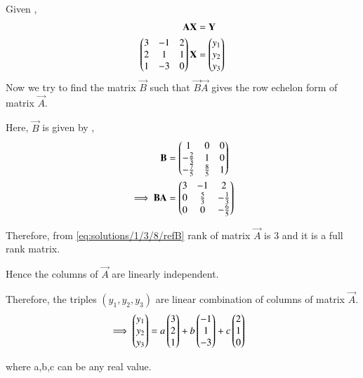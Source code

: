
Given , 
\begin{align}
    \mathbf{A}\mathbf{X}&=\mathbf{Y}\label{eq:solutions/1/3/8/system}\\
    \begin{pmatrix}3 & -1 & 2\\2 & 1 & 1\\1 & -3 & 0\end{pmatrix}\mathbf{X}&=\begin{pmatrix}y_1 \\y_2\\y_3\end{pmatrix}\label{eq:solutions/1/3/8/given}
\end{align}
Now we try to find the matrix $\vec{B}$ such that $\vec{B}\vec{A}$ gives the row echelon form of matrix $\vec{A}$.

Here, $\vec{B}$ is given by , 
\begin{align}
    \mathbf{B}&=\begin{pmatrix}1&0&0\\-\frac{2}{3}&1&0\\-\frac{7}{5}&\frac{8}{5}&1\end{pmatrix}\label{eq:solutions/1/3/8/B}\\
    \implies\mathbf{B}\mathbf{A}&=\begin{pmatrix}3 & -1 & 2\\0 & \frac{5}{3} & -\frac{1}{3}\\0 & 0 & -\frac{6}{5}\end{pmatrix}\label{eq:solutions/1/3/8/refB}
\end{align}

Therefore, from \eqref{eq:solutions/1/3/8/refB} rank of matrix $\vec{A}$ is 3 and it is a full rank matrix.

Hence the columns of $\vec{A}$ are linearly independent.

Therefore, the triples $(y_1,y_2,y_3)$ are linear combination of columns of matrix $\vec{A}$.
\begin{align}
    \implies\begin{pmatrix}y_1\\y_2\\y_3\end{pmatrix}&=a\begin{pmatrix}3\\2\\1\end{pmatrix}+b\begin{pmatrix}-1\\1\\-3\end{pmatrix}+c\begin{pmatrix}2\\1\\0\end{pmatrix}
\end{align}

where a,b,c can be any real value.
